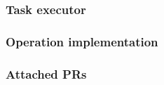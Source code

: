 \documentclass[../main.tex]{subfiles}
\begin{document}
\subsubsection*{Task executor}


\subsubsection*{Operation implementation}


\subsubsection*{Attached PRs}

\end{document}
